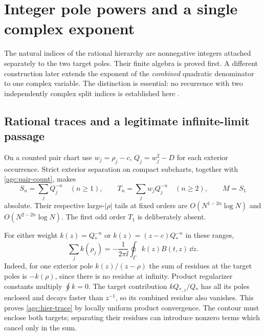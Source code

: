 \section{Integer pole powers and a single complex exponent}
\label{sec:hierarchy}

The natural indices of the rational hierarchy are nonnegative integers
attached separately to the two target poles. Their finite algebra is
proved first. A different construction later extends the exponent of
the \emph{combined} quadratic denominator to one complex variable.
The distinction is essential: no recurrence with two independently
complex split indices is established here
\cite{VCDCMManuscript,VCDCMDiscussion08}.

\subsection{Rational traces and a legitimate infinite-limit passage}

On a counted pair chart use $w_j=\rho_j-c$, $Q_j=w_j^2-D$ for
each exterior occurrence. Strict exterior separation on compact
subcharts, together with \eqref{agc:pair-count}, makes
\begin{equation}
 S_n=\sum_jQ_j^{-n}\quad(n\ge1),\qquad
 T_n=\sum_jw_jQ_j^{-n}\quad(n\ge2),\qquad M=S_1
 \label{agc:hier-ST}
\end{equation}
absolute. Their respective large-$|\rho|$ tails at fixed orders are
$O(N^{1-2n}\log N)$ and $O(N^{2-2n}\log N)$.
The first odd order $T_1$ is deliberately absent.

For either weight $k(z)=Q_*^{-n}$ or
$k(z)=(z-c)Q_*^{-n}$ in these ranges,
\begin{equation}
 \sum_j k(\rho_j)=-\frac1{2\pi\ii}
                       \oint_\Gamma k(z)B(t,z)\,\dd z.
 \label{agc:hier-trace}
\end{equation}
Indeed, for one exterior pole $k(z)/(z-\rho)$ the sum of residues
at the target poles is $-k(\rho)$, since there is no residue at
infinity. Product regularizer constants multiply $\oint k=0$.
The target contribution $kQ_{*,z}/Q_*$ has all its poles enclosed
and decays faster than $z^{-1}$, so its combined residue also vanishes.
This proves \eqref{agc:hier-trace} by locally uniform product
convergence. The contour must enclose both targets; separating their
residues can introduce nonzero terms which cancel only in the sum.

